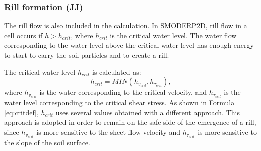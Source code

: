 
        \subsubsection{Rill formation (JJ)}

            The rill flow is also included in the calculation. In SMODERP2D, rill flow in a
            cell occurs if $h>h_{crit}$, where $h_{crit}$ is the critical water level. The
            water flow corresponding to the water level above the critical water level has
            enough energy to start to carry the soil particles and to create a rill.

            The critical water level $h_{crit}$ is calculated as:
            \begin{equation}
              h_{crit} = MIN(h_{v_{crit}},h_{\tau_{crit}}),
              \label{eq:critdef}
            \end{equation}
            where $h_{v_{crit}}$ is the water corresponding to the critical velocity, and
            $h_{\tau_{crit}}$ is the water level corresponding to the critical shear
            stress.  As shown in Formula \ref{eq:critdef}, $h_{crit}$ uses several values
            obtained with a different approach. This approach is adopted in order to remain
            on the safe side of the emergence of a rill, since $h_{v_{crit}}$ is more
            sensitive to the sheet flow velocity and $h_{\tau_{crit}}$ is more sensitive to
            the slope of the soil surface. 


